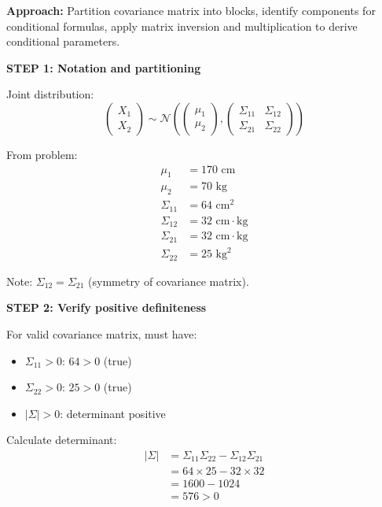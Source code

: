 \documentclass[12pt]{article}
\begin{document}
\begin{solution}

\textbf{Approach:} Partition covariance matrix into blocks, identify components for conditional formulas, apply matrix inversion and multiplication to derive conditional parameters.

\textbf{STEP 1: Notation and partitioning}

Joint distribution:
\[
\begin{pmatrix} X_1 \\ X_2 \end{pmatrix} \sim \mathcal{N}\left(\begin{pmatrix} \mu_1 \\ \mu_2 \end{pmatrix}, \begin{pmatrix} \Sigma_{11} & \Sigma_{12} \\ \Sigma_{21} & \Sigma_{22} \end{pmatrix}\right)
\]

From problem:
\begin{align*}
\mu_1 &= 170 \text{ cm} \\
\mu_2 &= 70 \text{ kg} \\
\Sigma_{11} &= 64 \text{ cm}^2 \\
\Sigma_{12} &= 32 \text{ cm} \cdot \text{kg} \\
\Sigma_{21} &= 32 \text{ cm} \cdot \text{kg} \\
\Sigma_{22} &= 25 \text{ kg}^2
\end{align*}

Note: $\Sigma_{12} = \Sigma_{21}$ (symmetry of covariance matrix).

\textbf{STEP 2: Verify positive definiteness}

For valid covariance matrix, must have:
\begin{itemize}
    \item $\Sigma_{11} > 0$: $64 > 0$ (true)
    \item $\Sigma_{22} > 0$: $25 > 0$ (true)
    \item $|\Sigma| > 0$: determinant positive
\end{itemize}

Calculate determinant:
\begin{align*}
|\Sigma| &= \Sigma_{11}\Sigma_{22} - \Sigma_{12}\Sigma_{21} \\
&= 64 \times 25 - 32 \times 32 \\
&= 1600 - 1024 \\
&= 576 > 0
\end{align*}


\end{solution}
\end{document}
